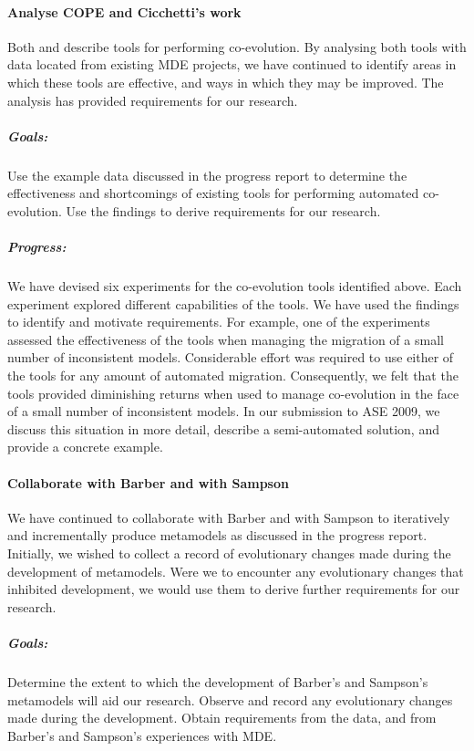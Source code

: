 \paragraph{Analyse COPE and Cicchetti's work} %
\label{par:analyse_existing_work}
Both \cite{herrmannsdoerfer08cope} and \cite{cicchetti08automating} describe tools for performing co-evolution. By analysing both tools with data located from existing MDE projects, we have continued to identify areas in which these tools are effective, and ways in which they may be improved. The analysis has provided requirements for our research.

\subparagraph{Goals:} Use the example data discussed in the progress report to determine the effectiveness and shortcomings of existing tools for performing automated co-evolution. Use the findings to derive requirements for our research.

\subparagraph{Progress:} We have devised six experiments for the co-evolution tools identified above. Each experiment explored different capabilities of the tools. We have used the findings to identify and motivate requirements. For example, one of the experiments assessed the effectiveness of the tools when managing the migration of a small number of inconsistent models. Considerable effort was required to use either of the tools for any amount of automated migration. Consequently, we felt that the tools provided diminishing returns when used to manage co-evolution in the face of a small number of inconsistent models. In our submission to ASE 2009, we discuss this situation in more detail, describe a semi-automated solution, and provide a concrete example.



\paragraph{Collaborate with Barber and with Sampson} %
\label{par:collaborate_with_barber_and_with_sampson}
We have continued to collaborate with Barber and with Sampson to iteratively and incrementally produce metamodels as discussed in the progress report. Initially, we wished to collect a record of evolutionary changes made during the development of metamodels. Were we to encounter any evolutionary changes that inhibited development, we would use them to derive further requirements for our research.

\subparagraph{Goals:} Determine the extent to which the development of Barber's and Sampson's metamodels will aid our research. Observe and record any evolutionary changes made during the development. Obtain requirements from the data, and from Barber's and Sampson's experiences with MDE.


